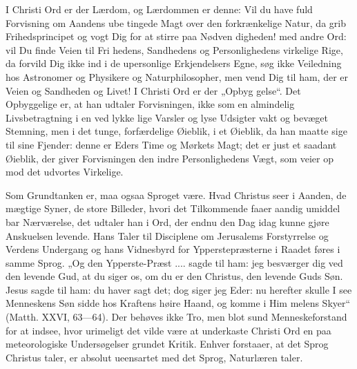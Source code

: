 \documentclass[12pt]{book}
\newcommand{\opage}[1]{\marginnote{\footnotesize\textit{[#1]}}}
\begin{document}
I Christi Ord er der Lærdom, og Lærdommen er
denne: Vil du have fuld Forvisning om Aandens ube\-%
tingede Magt over den forkrænkelige Natur, da grib
Frihedsprincipet og vogt Dig for at stirre paa Nødven\-%
digheden! med andre Ord: vil Du finde Veien til Fri\-%
hedens, Sandhedens og Personlighedens virkelige Rige,
da forvild Dig ikke ind i de upersonlige Erkjendelsers
Egne, søg ikke Veiledning hos Astronomer og Physikere
og Naturphilosopher, men vend Dig til ham, der er Veien
og Sandheden og Livet! I Christi Ord er der „Opbyg\-%
gelse“. Det Opbyggelige er, at han udtaler Forvisningen,
ikke som en almindelig Livsbetragtning i en ved lykke\-%
lige Varsler og lyse Udsigter vakt og bevæget Stemning,
men i det tunge, forfærdelige Øieblik, i et Øieblik, da
\opage{206}\setcounter{footnote}{0}%
han maatte sige til sine Fjender: denne er Eders Time
og Mørkets Magt; det er just et saadant Øieblik, der
giver Forvisningen den indre Personlighedens Vægt, som
veier op mod det udvortes Virkelige.

Som Grundtanken er, maa ogsaa Sproget være.
Hvad Christus seer i Aanden, de mægtige Syner, de store
Billeder, hvori det Tilkommende faaer aandig umiddel\-%
bar Nærværelse, det udtaler han i Ord, der endnu den
Dag idag kunne gjøre Anskuelsen levende. Hans Taler
til Disciplene om Jerusalems Forstyrrelse og Verdens
Undergang og hans Vidnesbyrd for Ypperstepræsterne i
Raadet føres i samme Sprog. „Og den Ypperste-Præst
.... sagde til ham: jeg besværger dig ved den levende
Gud, at du siger os, om du er den Christus, den levende
Guds Søn. Jesus sagde til ham: du haver sagt det;
dog siger jeg Eder: nu herefter skulle I see Menneskens
Søn sidde hos Kraftens høire Haand, og komme i Him\-%
melens Skyer“ (Matth. XXVI, 63---64). Der behøves
ikke Tro, men blot sund Menneskeforstand for at indsee,
hvor urimeligt det vilde være at underkaste Christi Ord
en paa meteorologiske Undersøgelser grundet Kritik.
Enhver forstaaer, at det Sprog Christus taler, er absolut
ueensartet med det Sprog, Naturlæren taler.
\end{document}
